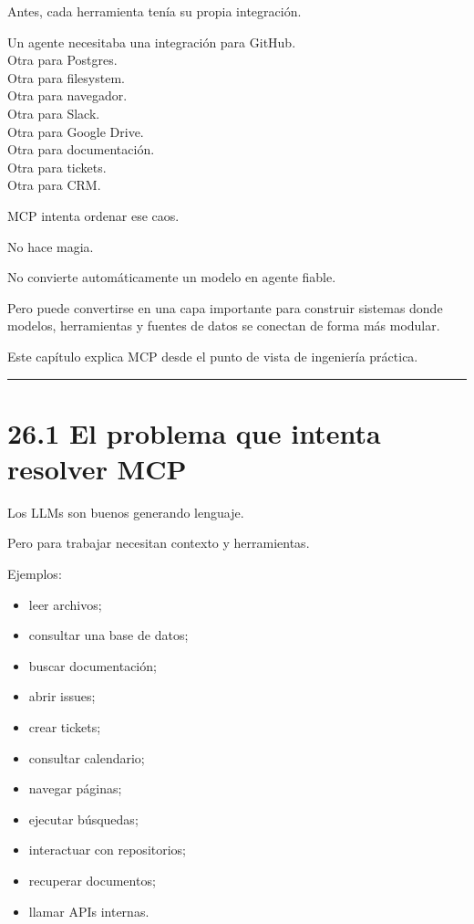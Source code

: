 Antes, cada herramienta tenía su propia integración.

Un agente necesitaba una integración para GitHub.\\
Otra para Postgres.\\
Otra para filesystem.\\
Otra para navegador.\\
Otra para Slack.\\
Otra para Google Drive.\\
Otra para documentación.\\
Otra para tickets.\\
Otra para CRM.

MCP intenta ordenar ese caos.

No hace magia.

No convierte automáticamente un modelo en agente fiable.

Pero puede convertirse en una capa importante para construir sistemas
donde modelos, herramientas y fuentes de datos se conectan de forma más
modular.

Este capítulo explica MCP desde el punto de vista de ingeniería
práctica.

\begin{center}\rule{0.5\linewidth}{0.5pt}\end{center}

\section{26.1 El problema que intenta resolver
MCP}\label{el-problema-que-intenta-resolver-mcp}

Los LLMs son buenos generando lenguaje.

Pero para trabajar necesitan contexto y herramientas.

Ejemplos:

\begin{itemize}
\tightlist
\item
  leer archivos;
\item
  consultar una base de datos;
\item
  buscar documentación;
\item
  abrir issues;
\item
  crear tickets;
\item
  consultar calendario;
\item
  navegar páginas;
\item
  ejecutar búsquedas;
\item
  interactuar con repositorios;
\item
  recuperar documentos;
\item
  llamar APIs internas.
\end{itemize}

